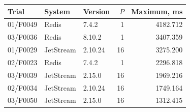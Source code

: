 \begin{tabular}{lllrr}
\toprule
Trial & System & Version & $P$ & Maximum, ms\\
\midrule
01/F0049 & Redis & 7.4.2 & 1 & 4182.712\\
03/F0036 & Redis & 8.10.2 & 1 & 3407.359\\
01/F0029 & JetStream & 2.10.24 & 16 & 3275.200\\
02/F0023 & Redis & 7.4.2 & 1 & 2296.818\\
03/F0039 & JetStream & 2.15.0 & 16 & 1969.216\\
02/F0034 & JetStream & 2.10.24 & 16 & 1749.164\\
03/F0050 & JetStream & 2.15.0 & 16 & 1312.415\\
\bottomrule
\end{tabular}
